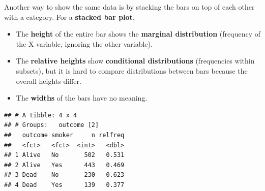 \documentclass[]{book}
\newenvironment{Shaded}{\begin{snugshade}}{\end{snugshade}}
\newcommand{\CommentTok}[1]{\textcolor[rgb]{0.56,0.35,0.01}{\textit{#1}}}
\newcommand{\DataTypeTok}[1]{\textcolor[rgb]{0.13,0.29,0.53}{#1}}
\newcommand{\KeywordTok}[1]{\textcolor[rgb]{0.13,0.29,0.53}{\textbf{#1}}}
\newcommand{\NormalTok}[1]{#1}
\newcommand{\OperatorTok}[1]{\textcolor[rgb]{0.81,0.36,0.00}{\textbf{#1}}}
\newcommand{\StringTok}[1]{\textcolor[rgb]{0.31,0.60,0.02}{#1}}
\providecommand{\tightlist}{%
  \setlength{\itemsep}{0pt}\setlength{\parskip}{0pt}}
\begin{document}
Another way to show the same data is by stacking the bars on top of each other with a category. For a \textbf{stacked bar plot},

\begin{itemize}
\tightlist
\item
  The \textbf{height} of the entire bar shows the \textbf{marginal distribution} (frequency of the X variable, ignoring the other variable).
\item
  The \textbf{relative heights} show \textbf{conditional distributions} (frequencies within subsets), but it is hard to compare distributions between bars because the overall heights differ.
\item
  The \textbf{widths} of the bars have no meaning.
\end{itemize}

\begin{Shaded}
\end{Shaded}

\begin{verbatim}
## # A tibble: 4 x 4
## # Groups:   outcome [2]
##   outcome smoker     n relfreq
##   <fct>   <fct>  <int>   <dbl>
## 1 Alive   No       502   0.531
## 2 Alive   Yes      443   0.469
## 3 Dead    No       230   0.623
## 4 Dead    Yes      139   0.377
\end{verbatim}

\begin{Shaded}
\end{Shaded}
\end{document}
